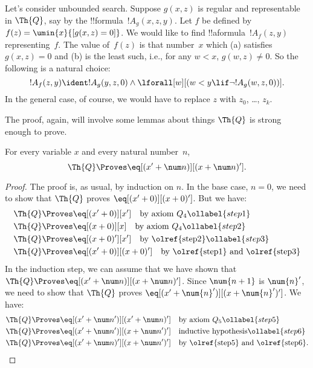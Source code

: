 \documentclass[../../../include/open-logic-section]{subfiles}
\begin{document}

Let's consider unbounded search. Suppose $g(x, z)$ is regular and
representable in $\Th{Q}$, say by the !!{formula}~$!A_g(x, z, y)$. Let
$f$ be defined by $f(z) = \umin{x}{[g(x, z) = 0]}$. We would like to find
!!a{formula}~$!A_f(z, y)$ representing~$f$.  The value of~$f(z)$ is
that number~$x$ which (a) satisfies $g(x, z) = 0$ and (b) is the least
such, i.e., for any $w < x$, $g(w, z) \neq 0$.  So the following is a
natural choice:
\[
!A_f(z,y) \ident !A_g(y, z, 0) \land \lforall[w][(w < y \lif \lnot
  !A_g(w, z, 0))].
\]
In the general case, of course, we would have to replace $z$ with
$z_0$, \dots, $z_k$.

The proof, again, will involve some lemmas about things $\Th{Q}$ is
strong enough to prove.

\begin{lem}
 For every variable $x$ and every natural
number~$n$,
\[
\Th{Q} \Proves \eq[(x' + \num n)][(x + \num n)'].
\]
\end{lem}

\begin{proof}
The proof is, as usual, by induction on $n$. In the base case, $n =
0$, we need to show that $\Th{Q}$ proves $\eq[(x'+0)][(x+0)']$. But we have:
\begin{align}
  \Th{Q} & \Proves \eq[(x' + 0)][x'] \quad \text{by axiom $Q_4$}
  \ollabel{step1}\\
  \Th{Q} & \Proves  \eq[(x + 0)][x] \quad \text{by axiom $Q_4$}
  \ollabel{step2} \\
  \Th{Q} & \Proves \eq[(x + 0)'][x'] \quad \text{by \olref{step2}}
  \ollabel{step3} \\
  \Th{Q} & \Proves \eq[(x' + 0)][(x + 0)'] \quad
  \text{by \olref{step1} and \olref{step3}}\notag
\end{align}
In the induction step, we can assume that we have shown that $\Th{Q}
\Proves \eq[(x' + \num n)][(x + \num n)']$. Since
$\num{n+1}$ is $\num{n}'$, we need to show that $\Th{Q}$ proves
$\eq[(x' + \num{n}')][(x + \num{n}')']$. We have:
\begin{align}
  \Th{Q} & \Proves \eq[(x' + \num n')][(x' + \num n)'] \quad
  \text{by axiom $Q_5$} \ollabel{step5}\\
  \Th{Q} & \Proves \eq[(x' + \num n')][(x + \num n')'] \quad
  \text{inductive hypothesis} \ollabel{step6}\\
  \Th{Q} & \Proves \eq[(x' + \num n)'][(x + \num n')'] \quad
  \text{by \olref{step5} and \olref{step6}.} \notag
\end{align}
\end{proof}
\end{document}
